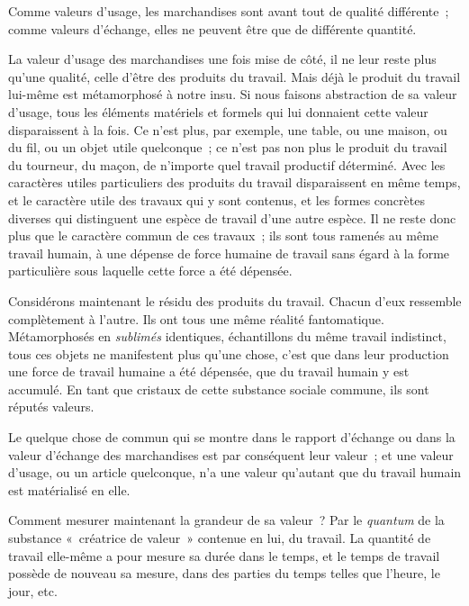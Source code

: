 \documentclass[french,twoside]{book} %
\begin{document}
Comme valeurs d’usage, les marchandises sont avant tout de qualité différente ; comme valeurs d’échange, elles ne peuvent être que de différente quantité.\par
La valeur d’usage des marchandises une fois mise de côté, il ne leur reste plus qu’une qualité, celle d’être des produits du travail. Mais déjà le produit du travail lui-même est métamorphosé à notre insu. Si nous faisons abstraction de sa valeur d’usage, tous les éléments matériels et formels qui lui donnaient cette valeur disparaissent à la fois. Ce n’est plus, par exemple, une table, ou une maison, ou du fil, ou un objet utile quelconque ; ce n’est pas non plus le produit du travail du tourneur, du maçon, de n’importe quel travail productif déterminé. Avec les caractères utiles particuliers des produits du travail disparaissent en même temps, et le caractère utile des travaux qui y sont contenus, et les formes concrètes diverses qui distinguent une espèce de travail d’une autre espèce. Il ne reste donc plus que le caractère commun de ces travaux ; ils sont tous ramenés au même travail humain, à une dépense de force humaine de travail sans égard à la forme particulière sous laquelle cette force a été dépensée.\par
Considérons maintenant le résidu des produits du travail. Chacun d’eux ressemble complètement à l’autre. Ils ont tous une même réalité fantomatique. Métamorphosés en \emph{sublimés} identiques, échantillons du même travail indistinct, tous ces objets ne manifestent plus qu’une chose, c’est que dans leur production une force de travail humaine a été dépensée, que du travail humain y est accumulé. En tant que cristaux de cette substance sociale commune, ils sont réputés valeurs.\par
Le quelque chose de commun qui se montre dans le rapport d’échange ou dans la valeur d’échange des marchandises est par conséquent leur valeur ; et une valeur d’usage, ou un article quelconque, n’a une valeur qu’autant que du travail humain est matérialisé en elle.\par
Comment mesurer maintenant la grandeur de sa valeur ? Par le \emph{quantum} de la substance « créatrice de valeur » contenue en lui, du travail. La quantité de travail elle-même a pour mesure sa durée dans le temps, et le temps de travail possède de nouveau sa mesure, dans des parties du temps telles que l’heure, le jour, etc.\par
\end{document}
